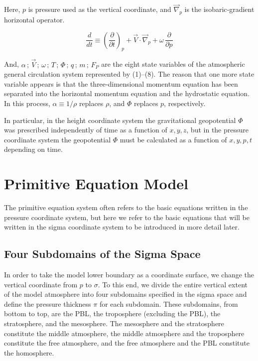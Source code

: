 \documentclass[12pt,openany]{book}
\begin{document}
Here, $p$ is pressure used as the vertical coordinate,
and $\vec{\nabla}_p$ is the isobaric‑gradient horizontal operator.

\begin{equation}
\frac{d}{d t}
\equiv
\left( \frac{\partial}{\partial t} \right)_p
+
\vec{V} \cdot \vec{\nabla}_p
+
\omega \, \frac{\partial}{\partial p}
\tag{2.9}
\label{eq:2.9}
\end{equation}

And, $\alpha \,;\, \vec{V} \,;\, \omega \,;\, T \,;\, \Phi \,;\, q \,;\, m \,;\, F_P$
are the eight state variables of the atmospheric general circulation
system represented by (1)--(8).
The reason that one more state variable appears is that the
three‑dimensional momentum equation has been separated into the
horizontal momentum equation and the hydrostatic equation.
In this process, $\alpha \equiv 1/\rho$ replaces $\rho$,
and $\Phi$ replaces $p$, respectively.

In particular, in the height coordinate system the gravitational
geopotential $\Phi$ was prescribed independently of time as a function
of $x, y, z$,
but in the pressure coordinate system the geopotential $\Phi$ must be
calculated as a function of $x, y, p, t$ depending on time.

\chapter{Primitive Equation Model}

The primitive equation system often refers to the basic equations
written in the pressure coordinate system, but here we refer to the
basic equations that will be written in the sigma coordinate system
to be introduced in more detail later.

\section{Four Subdomains of the Sigma Space}

In order to take the model lower boundary as a coordinate surface,
we change the vertical coordinate from $p$ to $\sigma$.
To this end, we divide the entire vertical extent of the model
atmosphere into four subdomains specified in the sigma space and
define the pressure thickness $\pi$ for each subdomain.
These subdomains, from bottom to top, are the PBL,
the troposphere (excluding the PBL),
the stratosphere, and the mesosphere.
The mesosphere and the stratosphere constitute the middle atmosphere,
the middle atmosphere and the troposphere constitute the free
atmosphere, and the free atmosphere and the PBL constitute the
homosphere.
\end{document}
